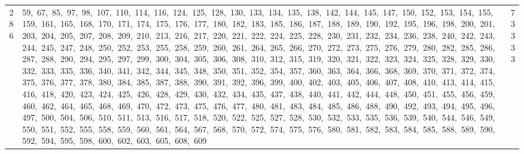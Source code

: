 \begin{longtable}{c|p{}|r}
286 & 59,\ 67,\ 85,\ 97,\ 98,\ 107,\ 110,\ 114,\ 116,\ 124,\ 125,\ 128,\ 130,\ 133,\ 134,\ 135,\ 138,\ 142,\ 144,\ 145,\ 147,\ 150,\ 152,\ 153,\ 154,\ 155,\ 159,\ 161,\ 165,\ 168,\ 170,\ 171,\ 174,\ 175,\ 176,\ 177,\ 180,\ 182,\ 183,\ 185,\ 186,\ 187,\ 188,\ 189,\ 190,\ 192,\ 195,\ 196,\ 198,\ 200,\ 201,\ 203,\ 204,\ 205,\ 207,\ 208,\ 209,\ 210,\ 213,\ 216,\ 217,\ 220,\ 221,\ 222,\ 224,\ 225,\ 228,\ 230,\ 231,\ 232,\ 234,\ 236,\ 238,\ 240,\ 242,\ 243,\ 244,\ 245,\ 247,\ 248,\ 250,\ 252,\ 253,\ 255,\ 258,\ 259,\ 260,\ 261,\ 264,\ 265,\ 266,\ 270,\ 272,\ 273,\ 275,\ 276,\ 279,\ 280,\ 282,\ 285,\ 286,\ 287,\ 288,\ 290,\ 294,\ 295,\ 297,\ 299,\ 300,\ 304,\ 305,\ 306,\ 308,\ 310,\ 312,\ 315,\ 319,\ 320,\ 321,\ 322,\ 323,\ 324,\ 325,\ 328,\ 329,\ 330,\ 332,\ 333,\ 335,\ 336,\ 340,\ 341,\ 342,\ 344,\ 345,\ 348,\ 350,\ 351,\ 352,\ 354,\ 357,\ 360,\ 363,\ 364,\ 366,\ 368,\ 369,\ 370,\ 371,\ 372,\ 374,\ 375,\ 376,\ 377,\ 378,\ 380,\ 384,\ 385,\ 387,\ 388,\ 390,\ 391,\ 392,\ 396,\ 399,\ 400,\ 402,\ 403,\ 405,\ 406,\ 407,\ 408,\ 410,\ 413,\ 414,\ 415,\ 416,\ 418,\ 420,\ 423,\ 424,\ 425,\ 426,\ 428,\ 429,\ 430,\ 432,\ 434,\ 435,\ 437,\ 438,\ 440,\ 441,\ 442,\ 444,\ 448,\ 450,\ 451,\ 455,\ 456,\ 459,\ 460,\ 462,\ 464,\ 465,\ 468,\ 469,\ 470,\ 472,\ 473,\ 475,\ 476,\ 477,\ 480,\ 481,\ 483,\ 484,\ 485,\ 486,\ 488,\ 490,\ 492,\ 493,\ 494,\ 495,\ 496,\ 497,\ 500,\ 504,\ 506,\ 510,\ 511,\ 513,\ 516,\ 517,\ 518,\ 520,\ 522,\ 525,\ 527,\ 528,\ 530,\ 532,\ 533,\ 535,\ 536,\ 539,\ 540,\ 544,\ 546,\ 549,\ 550,\ 551,\ 552,\ 555,\ 558,\ 559,\ 560,\ 561,\ 564,\ 567,\ 568,\ 570,\ 572,\ 574,\ 575,\ 576,\ 580,\ 581,\ 582,\ 583,\ 584,\ 585,\ 588,\ 589,\ 590,\ 592,\ 594,\ 595,\ 598,\ 600,\ 602,\ 603,\ 605,\ 608,\ 609 & 73333 \\

\end{longtable}
